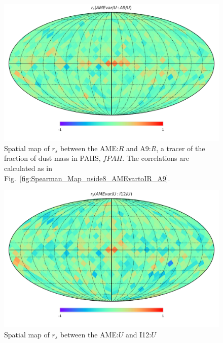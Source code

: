     \begin{figure}
      \includegraphics[width=\textwidth/2]{../Plots/Allsky_Corr/RadNorm/Spearman_Map_nside8_AMEvartoA9.pdf}
      \centering
      \caption{Spatial map of $r_{s}$ between the AME:$R$ and A9:$R$, a tracer of the fraction of dust mass in PAHS, $fPAH$. The correlations are calculated as in Fig.~\ref{fig:Spearman_Map_nside8_AMEvartoIR_A9}.}
      \label{fig:Spearman_Map_nside8_AMEvartoIR_RadNorm_A9}
    \end{figure}
    \begin{figure}
      \includegraphics[width=\textwidth/2]{../Plots/Allsky_Corr/RadNorm/Spearman_Map_nside8_AMEvartoI12.pdf}
      \centering
      \caption{Spatial map of $r_{s}$ between the AME:$U$ and I12:$U$}
      \label{fig:Spearman_Map_nside8_AMEvartoIR_RadNorm_I12}
    \end{figure}
